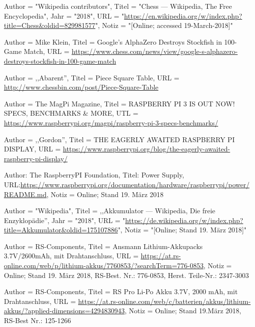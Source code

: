 \documentclass[12pt,a4paper]{article}
\begin{document}
{\begingroup
\renewcommand{\section}[2]{}
\begin{thebibliography}{}
    Author = "Wikipedia contributors",
    Titel = "Chess --- Wikipedia{,} The Free Encyclopedia",
    Jahr = "2018",
    URL = "\url{https://en.wikipedia.org/w/index.php?title=Chess&oldid=829981577}",
    Notiz = "[Online; accessed 19-March-2018]"
    
    	Author = Mike Klein, Titel = Google's AlphaZero Destroys Stockfish in 100-Game Match, 
    	URL = \url{https://www.chess.com/news/view/google-s-alphazero-destroys-stockfish-in-100-game-match}
	
	Author = ,,Abarent'', Titel = Piece Square Table, URL = \url{http://www.chessbin.com/post/Piece-Square-Table}    	
	
	Author = The MagPi Magazine, Titel = RASPBERRY PI 3 IS OUT NOW! SPECS, BENCHMARKS \& MORE, 
	UTL = \url{https://www.raspberrypi.org/magpi/raspberry-pi-3-specs-benchmarks/}
	
	Author = ,,Gordon'', Titel = THE EAGERLY AWAITED RASPBERRY PI DISPLAY, 
	URL = \url{https://www.raspberrypi.org/blog/the-eagerly-awaited-raspberry-pi-display/}
    	
		Author: The RaspberryPI Foundation, Titel: Power Supply,
		URL:\url{https://www.raspberrypi.org/documentation/hardware/raspberrypi/power/README.md},
		Notiz = Online; Stand 19. März 2018
		
	 Author = "Wikipedia",
   Titel = ,,Akkumulator --- Wikipedia{,} Die freie Enzyklopädie'',
   Jahr = "2018",
   URL = "\url{https://de.wikipedia.org/w/index.php?title=Akkumulator&oldid=175107886}",
   Notiz = "[Online; Stand 19. März 2018]"
   
   Author = RS-Components,
   Titel = Ansmann Lithium-Akkupacks 3.7V/2600mAh, mit Drahtanschluss,
   URL = \url{https://at.rs-online.com/web/p/lithium-akkus/7760853/?searchTerm=776-0853},
	Notiz = Online; Stand 19. März 2018,
	RS-Best. Nr.: 776-0853,
	Herst. Teile-Nr.: 2347-3003
	
	Author = RS-Components,
	Titel = RS Pro Li-Po Akku 3.7V, 2000 mAh, mit Drahtanschluss,
	URL = \url{https://at.rs-online.com/web/c/batterien/akkus/lithium-akkus/?applied-dimensions=4294830943},
	Notiz = Online; Stand 19.März 2018,
	RS-Best Nr.: 125-1266
	

\end{thebibliography}}
\end{document}
